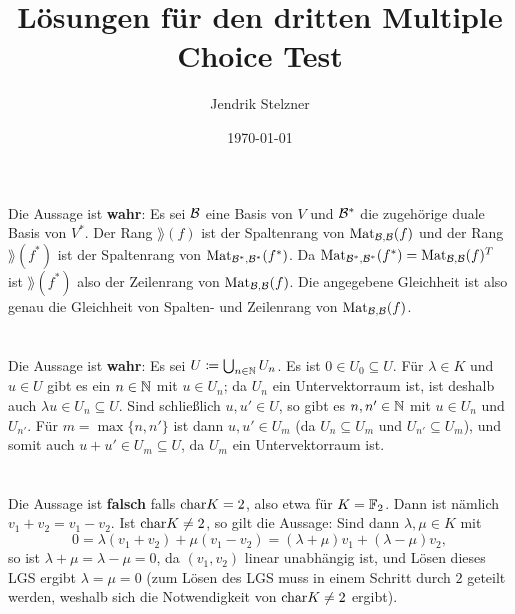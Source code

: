 \documentclass[a4paper,10pt]{article}
\title{Lösungen für den dritten Multiple Choice Test}
\author{Jendrik Stelzner}
\date{\today}
\begin{document}
\maketitle





\section{}
Die Aussage ist \textbf{wahr}: Es sei $\mathcal{B}$ eine Basis von $V$ und $\mathcal{B}^*$ die zugehörige duale Basis von $V^*$. Der Rang $\rang(f)$ ist der Spaltenrang von $\mathrm{Mat}_{\mathcal{B},\mathcal{B}}(f)$ und der Rang $\rang(f^*)$ ist der Spaltenrang von $\mathrm{Mat}_{\mathcal{B}^*,\mathcal{B}^*}(f^*)$. Da $\mathrm{Mat}_{\mathcal{B}^*,\mathcal{B}^*}(f^*) = \mathrm{Mat}_{\mathcal{B},\mathcal{B}}(f)^T$ ist $\rang(f^*)$ also der Zeilenrang von $\mathrm{Mat}_{\mathcal{B},\mathcal{B}}(f)$. Die angegebene Gleichheit ist also genau die Gleichheit von Spalten- und Zeilenrang von $\mathrm{Mat}_{\mathcal{B},\mathcal{B}}(f)$.




\section{}
Die Aussage ist \textbf{wahr}: Es sei $U \coloneqq \bigcup_{n \in \mathbb{N}} U_n$. Es ist $0 \in U_0 \subseteq U$. Für $\lambda \in K$ und $u \in U$ gibt es ein $n \in \mathbb{N}$ mit $u \in U_n$; da $U_n$ ein Untervektorraum ist, ist deshalb auch $\lambda u \in U_n \subseteq U$. Sind schließlich $u,u' \in U$, so gibt es $n, n' \in \mathbb{N}$ mit $u \in U_n$ und $U_{n'}$. Für $m = \max\{n,n'\}$ ist dann $u, u' \in U_m$ (da $U_n \subseteq U_m$ und $U_{n'} \subseteq U_m$), und somit auch $u + u' \in U_m \subseteq U$, da $U_m$ ein Untervektorraum ist.





\section{}
Die Aussage ist \textbf{falsch} falls $\mathrm{char} K = 2$, also etwa für $K = \mathbb{F}_2$. Dann ist nämlich $v_1 + v_2 = v_1 - v_2$. Ist $\mathrm{char} K \neq 2$, so gilt die Aussage: Sind dann $\lambda, \mu \in K$ mit
\[
 0 = \lambda (v_1 + v_2) + \mu (v_1 - v_2) = (\lambda + \mu) v_1 + (\lambda - \mu) v_2,
\]
so ist $\lambda + \mu = \lambda - \mu = 0$, da $(v_1, v_2)$ linear unabhängig ist, und Lösen dieses LGS ergibt $\lambda = \mu = 0$ (zum Lösen des LGS muss in einem Schritt durch $2$ geteilt werden, weshalb sich die Notwendigkeit von $\mathrm{char} K \neq 2$ ergibt).
\end{document}
